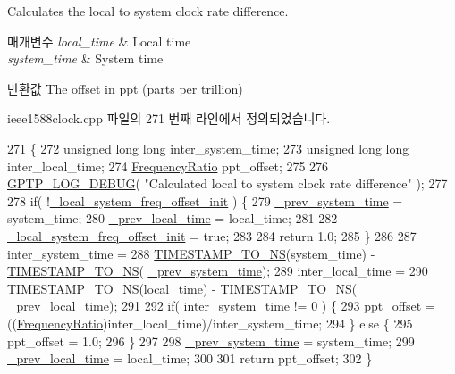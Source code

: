 Calculates the local to system clock rate difference. 


\begin{DoxyParams}{매개변수}
{\em local\+\_\+time} & Local time \\
\hline
{\em system\+\_\+time} & System time \\
\hline
\end{DoxyParams}
\begin{DoxyReturn}{반환값}
The offset in ppt (parts per trillion) 
\end{DoxyReturn}


ieee1588clock.\+cpp 파일의 271 번째 라인에서 정의되었습니다.


\begin{DoxyCode}
271                                                                                                            
         \{
272     \textcolor{keywordtype}{unsigned} \textcolor{keywordtype}{long} \textcolor{keywordtype}{long} inter\_system\_time;
273     \textcolor{keywordtype}{unsigned} \textcolor{keywordtype}{long} \textcolor{keywordtype}{long} inter\_local\_time;
274     \hyperlink{ptptypes_8hpp_a84de47dc2ed889ecd2b61706d3ad0f2e}{FrequencyRatio} ppt\_offset;
275 
276     \hyperlink{gptp__log_8hpp_ae4c6efe7c9cf6d7d3bbd28a0fd087d61}{GPTP\_LOG\_DEBUG}( \textcolor{stringliteral}{"Calculated local to system clock rate difference"} );
277 
278     \textcolor{keywordflow}{if}( !\hyperlink{class_i_e_e_e1588_clock_a2fc199ad709f7a96543b241f8e4f12a8}{\_local\_system\_freq\_offset\_init} ) \{
279         \hyperlink{class_i_e_e_e1588_clock_a41e7bda38ca1214821d6ebf5164aea96}{\_prev\_system\_time} = system\_time;
280         \hyperlink{class_i_e_e_e1588_clock_a6f5e345b7156222b4c38108c4e98823f}{\_prev\_local\_time} = local\_time;
281 
282         \hyperlink{class_i_e_e_e1588_clock_a2fc199ad709f7a96543b241f8e4f12a8}{\_local\_system\_freq\_offset\_init} = \textcolor{keyword}{true};
283 
284         \textcolor{keywordflow}{return} 1.0;
285     \}
286 
287     inter\_system\_time =
288         \hyperlink{ieee1588_8hpp_a0f6cecd8adce4a7314f084f3ead49999}{TIMESTAMP\_TO\_NS}(system\_time) - \hyperlink{ieee1588_8hpp_a0f6cecd8adce4a7314f084f3ead49999}{TIMESTAMP\_TO\_NS}(
      \hyperlink{class_i_e_e_e1588_clock_a41e7bda38ca1214821d6ebf5164aea96}{\_prev\_system\_time});
289     inter\_local\_time  =
290         \hyperlink{ieee1588_8hpp_a0f6cecd8adce4a7314f084f3ead49999}{TIMESTAMP\_TO\_NS}(local\_time) -  \hyperlink{ieee1588_8hpp_a0f6cecd8adce4a7314f084f3ead49999}{TIMESTAMP\_TO\_NS}(
      \hyperlink{class_i_e_e_e1588_clock_a6f5e345b7156222b4c38108c4e98823f}{\_prev\_local\_time});
291 
292     \textcolor{keywordflow}{if}( inter\_system\_time != 0 ) \{
293         ppt\_offset = ((\hyperlink{ptptypes_8hpp_a84de47dc2ed889ecd2b61706d3ad0f2e}{FrequencyRatio})inter\_local\_time)/inter\_system\_time;
294     \} \textcolor{keywordflow}{else} \{
295         ppt\_offset = 1.0;
296     \}
297 
298     \hyperlink{class_i_e_e_e1588_clock_a41e7bda38ca1214821d6ebf5164aea96}{\_prev\_system\_time} = system\_time;
299     \hyperlink{class_i_e_e_e1588_clock_a6f5e345b7156222b4c38108c4e98823f}{\_prev\_local\_time} = local\_time;
300 
301   \textcolor{keywordflow}{return} ppt\_offset;
302 \}
\end{DoxyCode}



